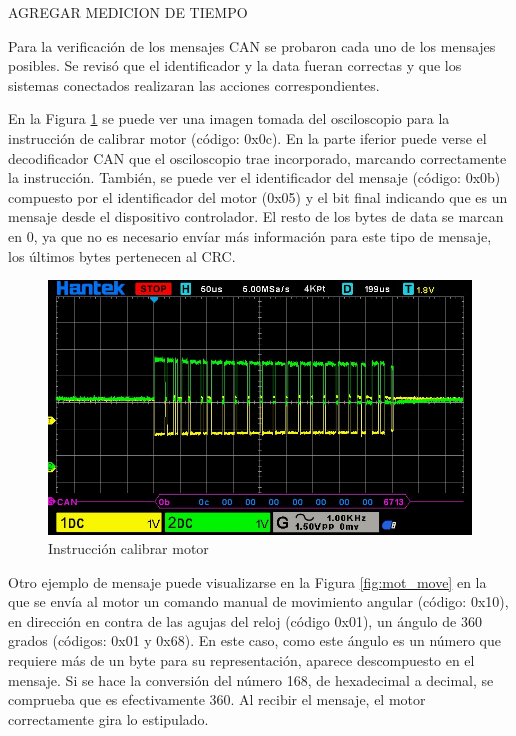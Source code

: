 AGREGAR MEDICION DE TIEMPO

Para la verificación de los mensajes CAN se probaron cada uno de los mensajes posibles. Se revisó que el identificador y la data fueran correctas y que los sistemas conectados realizaran las acciones correspondientes.

En la Figura \ref{fig:mot_calib} se puede ver una imagen tomada del osciloscopio para la instrucción de calibrar motor (código: 0x0c). En la parte iferior puede verse el decodificador CAN que el osciloscopio trae incorporado, marcando correctamente la instrucción. También, se puede ver el identificador del mensaje (código: 0x0b) compuesto por el identificador del motor (0x05) y el bit final indicando que es un mensaje desde el dispositivo controlador. El resto de los bytes de data se marcan en 0, ya que no es necesario envíar más información para este tipo de mensaje, los últimos bytes pertenecen al CRC.

\begin{figure}[htbp]
	\centering
	\includegraphics[scale=0.6]{./Figures/Motor_Calibrate.jpg}
	\caption{Instrucción calibrar motor}
	\label{fig:mot_calib}
\end{figure}

Otro ejemplo de mensaje puede visualizarse en la Figura \ref{fig:mot_move} en la que se envía al motor un comando manual de movimiento angular (código: 0x10), en dirección en contra de las agujas del reloj (código 0x01), un ángulo de 360 grados (códigos: 0x01 y 0x68). En este caso, como este ángulo es un número que requiere más de un byte para su representación, aparece descompuesto en el mensaje. Si se hace la conversión del número 168, de hexadecimal a decimal, se comprueba que es efectivamente 360. Al recibir el mensaje, el motor correctamente gira lo estipulado.

